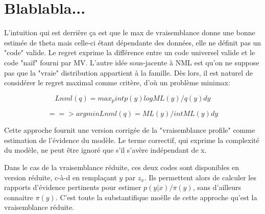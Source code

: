 \documentclass{article}
\begin{document}
\section{Blablabla...}


L'intuition qui est derri\`ere \c{c}a est que le max de vraisemblance donne une bonne estim\'ee de theta mais celle-ci \'etant d\'ependante des donn\'ees, elle ne d\'efinit pas un "code" valide. Le regret exprime la diff\'erence entre un code universel valide et le code "na\"if" fourni par MV. L'autre id\'ee sous-jacente \`a NML est qu'on ne suppose pas que la "vraie" distribution appartient \`a la famille. D\`es lors, il est naturel de consid\'erer le regret maximal comme crit\`ere, d'o\`u un probl\`eme minimax: 

$$Lnml(q) = max_p int p(y) log ML(y)/q(y) dy$$ 

$$==> argmin Lnml(q) = ML(y) / int ML(y) dy$$ 

Cette approche fournit une version corrig\'ee de la "vraisemblance profile" comme estimation de l'\'evidence du mod\`ele. Le terme correctif, qui exprime la complexit\'e du mod\`ele, ne peut \^etre ignor\'e que s'il s'av\`ere ind\'ependant de x. 

Dans le cas de la vraisemblance r\'eduite, ces deux codes sont disponibles en version r\'eduite, c-\`a-d en rempla\c{c}ant $y$ par $z_x$. Ils permettent alors de calculer les rapports d'\'evidence pertinents pour estimer $p(y|x)/\pi(y)$, sans d'ailleurs connaitre $\pi(y)$. C'est toute la substantifique mo\"elle de cette approche qu'est la vraisemblance r\'eduite. 
\end{document}
